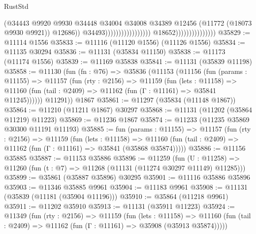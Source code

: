 \begin{lexlean}{RustStd}
\begin{coremodule}
                                                                      (@34443
                                                                        @9920
                                                                        @9930
                                                                        @34448
                                                                        @34004
                                                                        @34008
                                                                        @34389
                                                                        @12456
                                                                        (@11772
                                                                          (@18073 @9930 @9921))
                                                                        @12686))
                                                                    @34493)))))))))))))))))
                                  @18652)))))))))))))))
@35829 := @11114 @1556
@35833 := @11116 (@11120 @1556) (@11126 @1556)
@35834 := @11135 @30294
@35836 := @11131 (@35834 @11150)
@35838 := @11173 (@11174 @1556)
@35839 := @11169 @35838
@35841 := @11131 (@35839 @11198)
@35858 := @11130
    (fun (fn : @76) =>
    @35836
      (@11153
        (@11156
          (fun (params : @11155) =>
          @11157
            (fun (rty : @2156) =>
            @11159
              (fun (lets : @11158) =>
              @11160 (fun (tail : @2409) => @11162 (fun (Γ : @11161) => @35841 @11245))))))
        @11291))
    @1867
@35861 := @11297 (@35834 (@11148 @1867))
@35864 := @11210 (@11211 @1867) @30297
@35868 := @11131 (@11202 (@35864 @11219) @11223)
@35869 := @11236 @1867
@35874 := @11233 (@11235 @35869 @30300 @11191 @11193)
@35885 := fun (params : @11155) =>
  @11157
    (fun (rty : @2156) =>
    @11159
      (fun (lets : @11158) =>
      @11160 (fun (tail : @2409) => @11162 (fun (Γ : @11161) => @35841 (@35868 @35874)))))
@35886 := @11156 @35885
@35887 := @11153 @35886
@35896 := @11259
    (fun (U : @11258) => @11260 (fun (t : @7) => @11268 (@11131 (@11274 @30297 @11149) @11285)))
@35899 := @35861 (@35887 @35896) @30295
@35901 := @11116 @35886 @35896
@35903 := @11346 @35885 @9961
@35904 := @11183 @9961
@35908 := @11131 (@35839 (@11181 (@35904 @11196)))
@35910 := @35864 (@11218 @9961)
@35911 := @11202 @35910
@35913 := @11131 (@35911 @11223)
@35924 := @11349
    (fun (rty : @2156) =>
    @11159
      (fun (lets : @11158) =>
      @11160 (fun (tail : @2409) => @11162 (fun (Γ : @11161) => @35908 (@35913 @35874)))))

\end{coremodule}
\end{lexlean}
